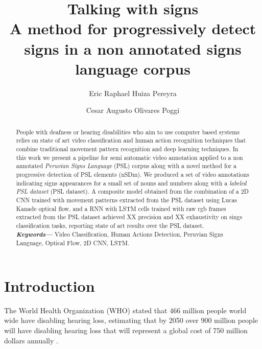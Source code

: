 \documentclass[twocolumn,conference]{article}
\providecommand{\keywords}[1]
{
  \small	
  \textbf{\textit{Keywords---}} #1
}
\begin{document}
\author[1]{Eric Raphael Huiza Pereyra}

\author[2]{Cesar Augusto Olivares Poggi}

\title{%
	\vspace{-2.0cm}
	\textbf{Talking with signs} \\	
	\Large \textbf{A method for progressively detect signs in a non annotated signs language corpus}
}

\maketitle
    
\begin{abstract}
People with deafness or hearing disabilities who aim to use computer based systems relies on state of art video classification and human action recognition techniques that combine traditional movement pattern recognition and deep learning techniques. In this work we present a pipeline for semi automatic video annotation applied to a non annotated \textit{Peruvian Signs Language} (PSL) corpus along with a novel method for a progressive detection of PSL elements (nSDm). We produced a set of video annotations indicating signs appearances for a small set of nouns and numbers along with a \textit{labeled PSL dataset} (PSL dataset). A composite model obtained from the combination of a 2D CNN trained with movement patterns extracted from the PSL dataset using Lucas Kanade optical flow, and a RNN with LSTM cells trained with raw rgb frames extracted from the PSL dataset achieved XX precision and XX exhaustivity on sings classification tasks, reporting state of art results over the PSL dataset. \\
\keywords{Video Classification, Human Actions Detection, Peruvian Signs Language, Optical Flow, 2D CNN, LSTM.}
\end{abstract}

\section{Introduction}\label{intro}
The World Health Organization (WHO) stated that 466 million people world wide have disabling hearing loss, estimating that by 2050 over 900 million people will have disabling hearing loss that will represent a global cost of 750 million dollars annually \cite{deafness_and_hearing_loss_2019}. 
\end{document}
